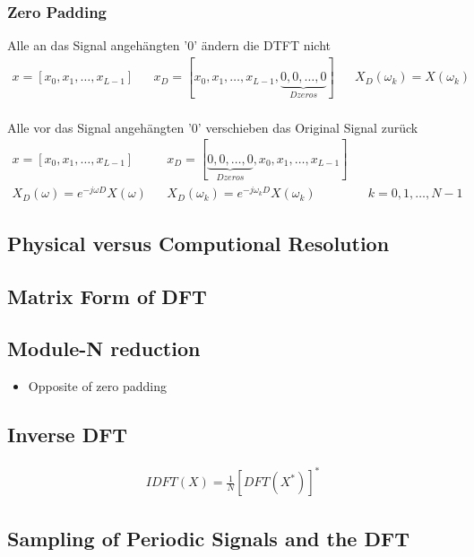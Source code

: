 \subsubsection{Zero Padding}
Alle an das Signal angehängten '0' ändern die DTFT nicht 
\begin{align*}
x= [x_0,x_1,\ldots,x_{L-1}] && x_D=[x_0,x_1,\ldots,x_{L-1},\underbrace{0,0,\ldots,0}_{D zeros}] && X_D(\omega_k)=X(\omega_k)\\
\end{align*}

Alle vor das Signal angehängten '0' verschieben das Original Signal zurück
\begin{align*}
x= [x_0,x_1,\ldots,x_{L-1}] && x_D=[\underbrace{0,0,\ldots,0}_{D zeros},x_0,x_1,\ldots,x_{L-1}] \\
X_D(\omega)=e^{-j\omega D}X(\omega) && X_D(\omega_k)=e^{-j\omega_k D}X(\omega_k) && k=0,1,\ldots,N-1
\end{align*}

\subsection{Physical versus Computional Resolution}

\subsection{Matrix Form of DFT}

\subsection{Module-N reduction}
\begin{itemize}
	\item Opposite of zero padding
\end{itemize}


\subsection{Inverse DFT}
\begin{align*}
	IDFT(X) = \frac{1}{N}\left[DFT(X^*)\right]^*
	\label{eq:IDFT}
\end{align*}

\subsection{Sampling of Periodic Signals and the DFT}

